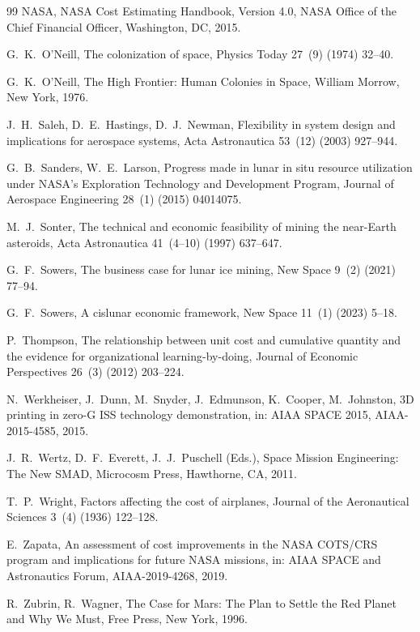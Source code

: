\documentclass[preprint,12pt]{elsarticle}
\begin{document}
\begin{thebibliography}{99}
NASA,
\newblock NASA Cost Estimating Handbook, Version 4.0,
\newblock NASA Office of the Chief Financial Officer, Washington, DC, 2015.

G.~K.~O'Neill,
\newblock The colonization of space,
\newblock Physics Today 27~(9) (1974) 32--40.

G.~K.~O'Neill,
\newblock The High Frontier: Human Colonies in Space,
\newblock William Morrow, New York, 1976.

J.~H.~Saleh, D.~E.~Hastings, D.~J.~Newman,
\newblock Flexibility in system design and implications for aerospace systems,
\newblock Acta Astronautica 53~(12) (2003) 927--944.

G.~B.~Sanders, W.~E.~Larson,
\newblock Progress made in lunar in situ resource utilization under NASA's Exploration Technology and Development Program,
\newblock Journal of Aerospace Engineering 28~(1) (2015) 04014075.

M.~J.~Sonter,
\newblock The technical and economic feasibility of mining the near-Earth asteroids,
\newblock Acta Astronautica 41~(4--10) (1997) 637--647.

G.~F.~Sowers,
\newblock The business case for lunar ice mining,
\newblock New Space 9~(2) (2021) 77--94.

G.~F.~Sowers,
\newblock A cislunar economic framework,
\newblock New Space 11~(1) (2023) 5--18.

P.~Thompson,
\newblock The relationship between unit cost and cumulative quantity and the evidence for organizational learning-by-doing,
\newblock Journal of Economic Perspectives 26~(3) (2012) 203--224.

N.~Werkheiser, J.~Dunn, M.~Snyder, J.~Edmunson, K.~Cooper, M.~Johnston,
\newblock 3D printing in zero-G ISS technology demonstration,
\newblock in: AIAA SPACE 2015, AIAA-2015-4585, 2015.

J.~R.~Wertz, D.~F.~Everett, J.~J.~Puschell (Eds.),
\newblock Space Mission Engineering: The New SMAD,
\newblock Microcosm Press, Hawthorne, CA, 2011.

T.~P.~Wright,
\newblock Factors affecting the cost of airplanes,
\newblock Journal of the Aeronautical Sciences 3~(4) (1936) 122--128.

E.~Zapata,
\newblock An assessment of cost improvements in the NASA COTS/CRS program and implications for future NASA missions,
\newblock in: AIAA SPACE and Astronautics Forum, AIAA-2019-4268, 2019.

R.~Zubrin, R.~Wagner,
\newblock The Case for Mars: The Plan to Settle the Red Planet and Why We Must,
\newblock Free Press, New York, 1996.

\end{thebibliography}
\end{document}
